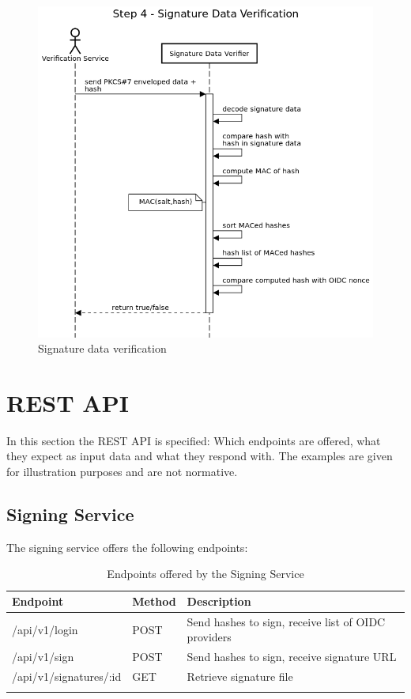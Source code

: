 \begin{figure}
	\begin{center}
		\includegraphics[scale=0.5]{images/protocol_verification_step4_signature_data.png}
		\caption{Signature data verification}
		\label{fig:signaturedataverification}
	\end{center}
\end{figure}

\section{REST API}\label{sec:rest-api}
In this section the \gls{REST} \gls{API} is specified:
Which endpoints are offered, what they expect as input data and what they respond with.
The examples are given for illustration purposes and are not normative.

\subsection{Signing Service}
The signing service offers the following endpoints:

\begin{longtable}{|l|l|l|}
	\hline
	\textbf{Endpoint} & \textbf{Method} & \textbf{Description} \\ \hline
	/api/v1/login & POST & Send hashes to sign, receive list of OIDC providers \\ \hline
	/api/v1/sign & POST & Send hashes to sign, receive signature URL \\ \hline
	/api/v1/signatures/:id & GET & Retrieve signature file \\ \hline
\caption{Endpoints offered by the Signing Service}
\end{longtable}

